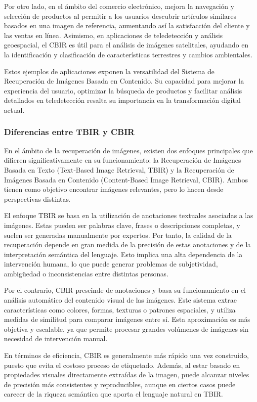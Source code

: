 Por otro lado, en el ámbito del comercio electrónico, mejora la navegación y selección de productos al permitir a los usuarios descubrir artículos similares basados en una imagen de referencia, aumentando así la satisfacción del cliente y las ventas en línea. Asimismo, en aplicaciones de teledetección y análisis geoespacial, el CBIR es útil para el análisis de imágenes satelitales, ayudando en la identificación y clasificación de características terrestres y cambios ambientales. \cite{li2021recent}

Estos ejemplos de aplicaciones exponen la versatilidad del Sistema de Recuperación de Imágenes Basada en Contenido. Su capacidad para mejorar la experiencia del usuario, optimizar la búsqueda de productos y facilitar análisis detallados en teledetección resalta su importancia en la transformación digital actual.

\subsubsection{Diferencias entre TBIR y CBIR}
En el ámbito de la recuperación de imágenes, existen dos enfoques principales que difieren significativamente en su funcionamiento: la Recuperación de Imágenes Basada en Texto (Text-Based Image Retrieval, TBIR) y la Recuperación de Imágenes Basada en Contenido (Content-Based Image Retrieval, CBIR). Ambos tienen como objetivo encontrar imágenes relevantes, pero lo hacen desde perspectivas distintas.

El enfoque TBIR se basa en la utilización de anotaciones textuales asociadas a las imágenes. Estas pueden ser palabras clave, frases o descripciones completas, y suelen ser generadas manualmente por expertos. Por tanto, la calidad de la recuperación depende en gran medida de la precisión de estas anotaciones y de la interpretación semántica del lenguaje. Esto implica una alta dependencia de la intervención humana, lo que puede generar problemas de subjetividad, ambigüedad o inconsistencias entre distintas personas.

Por el contrario, CBIR prescinde de anotaciones y basa su funcionamiento en el análisis automático del contenido visual de las imágenes. Este sistema extrae características como colores, formas, texturas o patrones espaciales, y utiliza medidas de similitud para comparar imágenes entre sí. Esta aproximación es más objetiva y escalable, ya que permite procesar grandes volúmenes de imágenes sin necesidad de intervención manual.

En términos de eficiencia, CBIR es generalmente más rápido una vez construido, puesto que evita el costoso proceso de etiquetado. Además, al estar basado en propiedades visuales directamente extraídas de la imagen, puede alcanzar niveles de precisión más consistentes y reproducibles, aunque en ciertos casos puede carecer de la riqueza semántica que aporta el lenguaje natural en TBIR.

